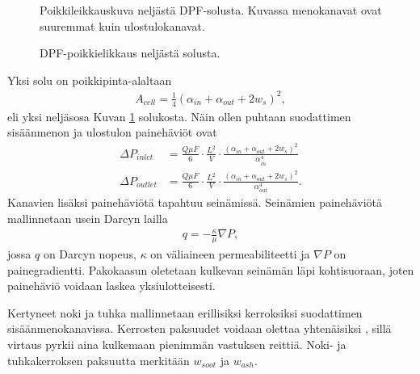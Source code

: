 \begin{figure}[H]
    \centering 
               {Poikkileikkauskuva neljästä DPF-solusta. Kuvassa menokanavat ovat suuremmat kuin ulostulokanavat.}
    \caption{DPF-poikkielikkaus neljästä solusta.}
    \label{fig:hac_dpf_clean}
\end{figure}
Yksi solu on poikkipinta-alaltaan
\begin{align}
    A_{cell}=\frac{1}{4}(\alpha_{in}+\alpha_{out}+2w_s)^2,
\end{align}
eli yksi neljäsosa Kuvan \ref{fig:hac_dpf_clean} solukosta. Näin ollen puhtaan suodattimen sisäänmenon ja ulostulon painehäviöt ovat
\begin{align}
    \Delta P_{inlet} &=\frac{Q \mu F}{6}\cdot \frac{L^2}{V} \cdot \frac{(\alpha_{in}+\alpha_{out}+2w_s)^2}{\alpha_{in}^4}
    \\ 
    \Delta P_{outlet} &=\frac{Q \mu F}{6}\cdot \frac{L^2}{V} \cdot \frac{(\alpha_{in}+\alpha_{out}+2w_s)^2}{\alpha_{out}^4}.
\end{align}
Kanavien lisäksi painehäviötä tapahtuu seinämissä. Seinämien painehäviötä mallinnetaan usein Darcyn lailla \cite{dieselnet_wall_flow_monolith}\cite{Konstandopoulos1989_wallflow}
\begin{align}
    q = - \frac{\kappa}{\mu}\nabla P,
\end{align}
jossa \(q\) on Darcyn nopeus, \(\kappa\) on väliaineen permeabiliteetti ja \(\nabla P\) on painegradientti. 
Pakokaasun oletetaan kulkevan seinämän läpi kohtisuoraan, joten painehäviö voidaan laskea yksiulotteisesti. 


Kertyneet noki ja tuhka mallinnetaan erillisiksi kerroksiksi suodattimen sisäänmenokanavissa. Kerrosten paksuudet voidaan  olettaa yhtenäisiksi \cite{Konstandopoulos2000} , sillä virtaus pyrkii aina kulkemaan pienimmän vastuksen reittiä. Noki- ja tuhkakerroksen paksuutta merkitään \(w_{soot}\) ja \(w_{ash}\).

